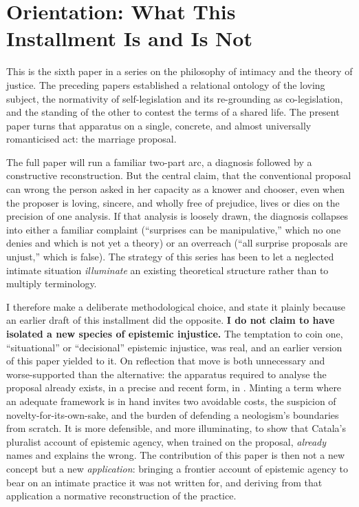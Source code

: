 \section{Orientation: What This Installment Is and Is Not}\label{p06:sec:orientation}

This is the sixth paper in a series on the philosophy of intimacy and the theory of justice. The preceding papers established a relational ontology of the loving subject, the normativity of self-legislation and its re-grounding as co-legislation, and the standing of the other to contest the terms of a shared life. The present paper turns that apparatus on a single, concrete, and almost universally romanticised act: the marriage proposal.

The full paper will run a familiar two-part arc, a diagnosis followed by a constructive reconstruction. But the central claim, that the conventional proposal can wrong the person asked in her capacity as a knower and chooser, even when the proposer is loving, sincere, and wholly free of prejudice, lives or dies on the precision of one analysis. If that analysis is loosely drawn, the diagnosis collapses into either a familiar complaint (``surprises can be manipulative,'' which no one denies and which is not yet a theory) or an overreach (``all surprise proposals are unjust,'' which is false). The strategy of this series has been to let a neglected intimate situation \emph{illuminate} an existing theoretical structure rather than to multiply terminology.

I therefore make a deliberate methodological choice, and state it plainly because an earlier draft of this installment did the opposite. \textbf{I do not claim to have isolated a new species of epistemic injustice.} The temptation to coin one, ``situational'' or ``decisional'' epistemic injustice, was real, and an earlier version of this paper yielded to it. On reflection that move is both unnecessary and worse-supported than the alternative: the apparatus required to analyse the proposal already exists, in a precise and recent form, in \textcite{catala2025dynamics}. Minting a term where an adequate framework is in hand invites two avoidable costs, the suspicion of novelty-for-its-own-sake, and the burden of defending a neologism's boundaries from scratch. It is more defensible, and more illuminating, to show that Catala's pluralist account of epistemic agency, when trained on the proposal, \emph{already} names and explains the wrong. The contribution of this paper is then not a new concept but a new \emph{application}: bringing a frontier account of epistemic agency to bear on an intimate practice it was not written for, and deriving from that application a normative reconstruction of the practice.

